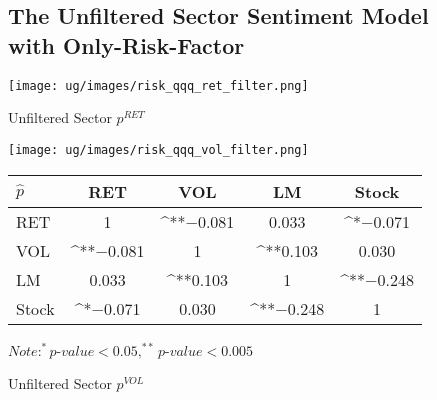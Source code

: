 \documentclass[logo,bsc,singlespacing,parskip]{infthesis}
\begin{document}
\begin{figure}[ht]
\subsection{The Unfiltered Sector Sentiment Model with Only-Risk-Factor}
\label{appendix_risk_qqq}
  \centering
  \begin{minipage}{0.5\textwidth}
    \centering
    \texttt{[image: ug/images/risk\_qqq\_ret\_filter.png]}
    \caption{\small Unfiltered Sector ${p}^{RET}$}
    \label{fig:risk_qqq_ret_unfiltered}
  \end{minipage}%
  \begin{minipage}{0.5\textwidth}
    \centering
    \texttt{[image: ug/images/risk\_qqq\_vol\_filter.png]} 
    \caption{\small Unfiltered Sector ${p}^{VOL}$}
    \label{fig:risk_qqq_vol_unfiltered}
  \end{minipage}


    \begin{minipage}[t]{0.9\textwidth}
    \centering
    \begin{tabular}{lcccc}
    \label{tab:risk_top10_corr_unfiltered}
    $\hat{p}$      & RET       & VOL       & LM        & Stock    \\ \hline
    RET    & 1  & ^{**}$-$0.081  & 0.033 & ^{*}$-$0.071 \\
    VOL    & ^{**}$-$0.081   & 1  & ^{**}0.103  & 0.030 \\
    LM    & 0.033  & ^{**}0.103 & 1  & ^{**}$-$0.248 \\
    Stock  & ^{*}$-$0.071 & 0.030  & ^{**}$-$0.248 & 1  \\ \hline
    \end{tabular}
    \medskip
    $\textit{Note}: ^{*}p$-$value<0.05, ^{**}p$-$value<0.005$
    \end{minipage}

\end{figure}
\end{document}
